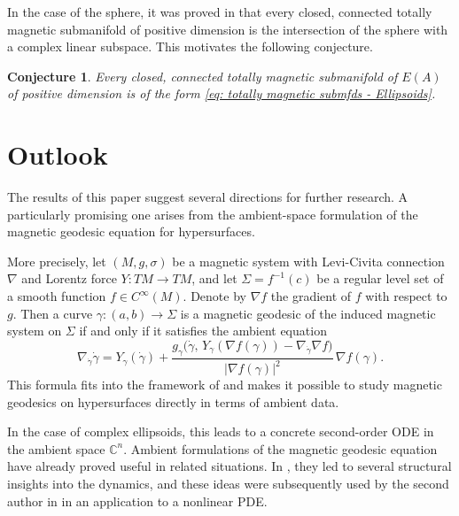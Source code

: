 \documentclass[11pt,reqno]{amsart}
\newcommand{\IC}{{\mathbb C}}%
\theoremstyle{plain}
\newtheorem{conj}[thm]{Conjecture}
\theoremstyle{definition}
\numberwithin{equation}{section}
\begin{document}
In the case of the sphere, it was proved in \cite[Cor.~1.5]{ABM} that every closed, connected totally magnetic submanifold of positive dimension is the intersection of the sphere with a complex linear subspace. This motivates the following conjecture.

\begin{conj}
\label{conj: totally magnetic submfds - Ellipsoids}
Every closed, connected totally magnetic submanifold of $E(A)$ of positive dimension is of the form \eqref{eq: totally magnetic submfds - Ellipsoids}.
\end{conj}



   
   
   
   
   

\section{Outlook}
\label{section: Outlook}

The results of this paper suggest several directions for further research. A particularly promising one arises from the ambient-space formulation of the magnetic geodesic equation for hypersurfaces.

More precisely, let $(M,g,\sigma)$ be a magnetic system with Levi-Civita connection $\nabla$ and Lorentz force $Y:TM\to TM$, and let $\Sigma=f^{-1}(c)$ be a regular level set of a smooth function $f\in C^\infty(M)$. Denote by $\nabla f$ the gradient of $f$ with respect to $g$. Then a curve $\gamma:(a,b)\to \Sigma$ is a magnetic geodesic of the induced magnetic system on $\Sigma$ if and only if it satisfies the ambient equation
\[
\nabla_{\dot \gamma} \dot \gamma
=
Y_\gamma(\dot \gamma)
+
\frac{g_\gamma\big(\dot \gamma,\, Y_\gamma(\nabla f(\gamma))-\nabla_{\dot \gamma}\nabla f\big)}{|\nabla f(\gamma)|^2}\,\nabla f(\gamma).
\]
This formula fits into the framework of \cite{Terek_submanifold_compatibility_equations_magnetic} and makes it possible to study magnetic geodesics on hypersurfaces directly in terms of ambient data.

In the case of complex ellipsoids, this leads to a concrete second-order ODE in the ambient space $\IC^n$. Ambient formulations of the magnetic geodesic equation have already proved useful in related situations. In \cite{ABM}, they led to several structural insights into the dynamics, and these ideas were subsequently used by the second author in \cite{M24} in an application to a nonlinear PDE.
\end{document}
